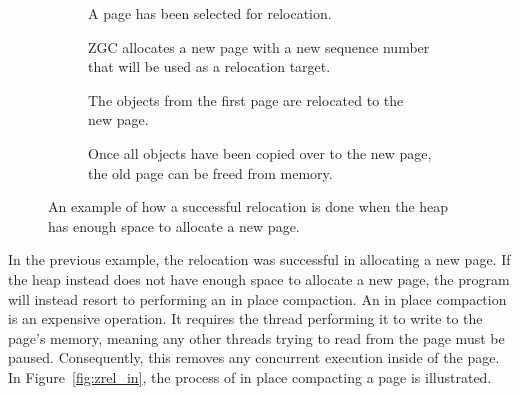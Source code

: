 \begin{figure}[H]
    \centering
    \begin{subfigure}[t]{.2\textwidth}
        \centering
        
        \caption{A page has been selected for relocation.}
        \label{fig:zrel_new1}
    \end{subfigure}%
    \hfill\vline\hfill
    \begin{subfigure}[t]{.2\textwidth}
        \centering
        
        \caption{ZGC allocates a new page with a new sequence number that will be used as a relocation target.}
        \label{fig:zrel_new2}
    \end{subfigure}%
    \hfill\vline\hfill
    \begin{subfigure}[t]{.2\textwidth}
        \centering
        
        \caption{The objects from the first page are relocated to the new page.}
        \label{fig:zrel_new3}
    \end{subfigure}%
    \hfill\vline\hfill
    \begin{subfigure}[t]{.2\textwidth}
        \centering
        
        \caption{Once all objects have been copied over to the new page, the old page can be freed from memory.}
        \label{fig:zrel_new3}
    \end{subfigure}%
    \caption{An example of how a successful relocation is done when the heap has enough space to allocate a new page.}
    \label{fig:zrel_new}
\end{figure}

In the previous example, the relocation was successful in allocating a new page. If the heap instead does not have enough space to allocate a new page, the program will instead resort to performing an in place compaction. An in place compaction is an expensive operation. It requires the thread performing it to write to the page's memory, meaning any other threads trying to read from the page must be paused. Consequently, this removes any concurrent execution inside of the page. In Figure~\ref{fig:zrel_in}, the process of in place compacting a page is illustrated. 


